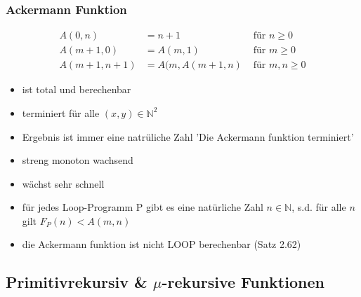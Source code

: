 \documentclass[a4paper, 10pt]{article}
\theoremstyle{definition}
\begin{document}
\subsubsection{Ackermann Funktion}
\begin{align*}
    A(0,n) &=n+1 &\text{ für }n\geq 0\\
    A(m+1,0)&=A(m,1) &\text{ für }m\geq 0\\
    A(m+1,n+1)&=A(m,A(m+1,n)&\text{ für }m,n\geq 0
\end{align*}
\begin{itemize}
    \item ist total und berechenbar
    \item terminiert für alle $(x,y)\in\mathbb{N}^2$
    \item Ergebnis ist immer eine natrüliche Zahl 'Die Ackermann funktion terminiert'
    \item streng monoton wachsend
    \item wächst sehr schnell 
    \item für jedes Loop-Programm P gibt es eine natürliche Zahl $n\in \mathbb{N}$, s.d. für alle $n$ gilt $F_P(n)<A(m,n)$
    \item die Ackermann funktion ist nicht LOOP berechenbar (Satz 2.62)
\end{itemize}
\subsection{Primitivrekursiv \& $\mu$-rekursive Funktionen}
\end{document}
